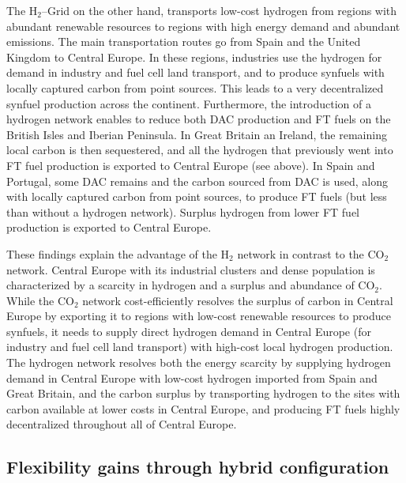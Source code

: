\documentclass[twocolumn]{article}
\newcommand{\carbon}{CO$_2$}
\newcommand{\hydrogen}{H$_2$}
\newcommand{\hydrogengrid}{\hydrogen{}--Grid}
\begin{document}
The \hydrogengrid{} on the other hand, transports low-cost hydrogen from regions with abundant renewable resources to regions with high energy demand and abundant emissions. The main transportation routes go from Spain and the United Kingdom to Central Europe. In these regions, industries use the hydrogen for demand in industry and fuel cell land transport, and to produce synfuels with locally captured carbon from point sources. This leads to a very decentralized synfuel production across the continent. Furthermore, the introduction of a hydrogen network enables to reduce both DAC production and FT fuels on the British Isles and Iberian Peninsula. In Great Britain an Ireland, the remaining local carbon is then sequestered, and all the hydrogen that previously went into FT fuel production is exported to Central Europe (see above). In Spain and Portugal, some DAC remains and the carbon sourced from DAC is used, along with locally captured carbon from point sources, to produce FT fuels (but less than without a hydrogen network). Surplus hydrogen from lower FT fuel production is exported to Central Europe.


These findings explain the advantage of the \hydrogen{} network in contrast to the \carbon{} network. Central Europe with its industrial clusters and dense population is characterized by a scarcity in hydrogen and a surplus and abundance of \carbon. While the \carbon{} network cost-efficiently resolves the surplus of carbon in Central Europe by exporting it to regions with low-cost renewable resources to produce synfuels, it needs to supply direct hydrogen demand in Central Europe (for industry and fuel cell land transport) with high-cost local hydrogen production. The hydrogen network resolves both the energy scarcity by supplying hydrogen demand in Central Europe with low-cost hydrogen imported from Spain and Great Britain, and the carbon surplus by transporting hydrogen to the sites with carbon available at lower costs in Central Europe, and producing FT fuels highly decentralized throughout all of Central Europe.


\subsection*{Flexibility gains through hybrid configuration}
\end{document}
